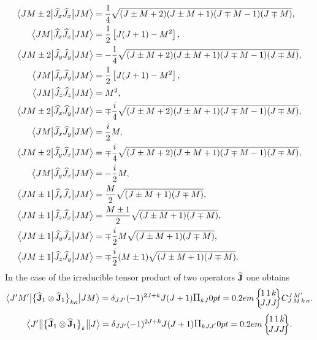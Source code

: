 \begin{align}
\bigl\langle  J M \pm 2 \big|  \widehat{J}_{x} \widehat{J}_{x} \big| J M \bigr\rangle & =\frac{1}{4} \sqrt{(J \pm M+2)(J \pm M+1)(J \mp M-1)(J \mp M)}, \notag\\
\bigl\langle  J M \big|  \widehat{J}_{x} \widehat{J}_{x} \big| J M \bigr\rangle & =\frac{1}{2}\left[J(J+1)-M^{2}\right], \notag\\
\bigl\langle  J M \pm 2 \big|  \widehat{J}_{y} \widehat{J}_{y} \big| J M \bigr\rangle & =-\frac{1}{4} \sqrt{(J \pm M+2)(J \pm M+1)(J \mp M-1)(J \mp M)}, \notag\\
\bigl\langle  J M \big|  \widehat{J}_{y} \widehat{J}_{y} \big| J M \bigr\rangle & =\frac{1}{2}\left[J(J+1)-M^{2}\right], \notag\\
\bigl\langle  J M \big|  \widehat{J}_{z} \widehat{J}_{z} \big| J M \bigr\rangle & =M^{2}, \notag\\
\bigl\langle  J M \pm 2 \big|  \widehat{J}_{x} \widehat{J}_{y} \big| J M \bigr\rangle & =\mp \frac{i}{4} \sqrt{(J \pm M+2)(J \pm M+1)(J \mp M-1)(J \mp M)}, \notag\\
\bigl\langle  J M \big|  \widehat{J}_{x} \widehat{J}_{y} \big| J M \bigr\rangle & =\frac{i}{2} M  \label{eq:13:2:46},\\
\bigl\langle  J M \pm 2 \big|  \widehat{J}_{y} \widehat{J}_{x} \big| J M \bigr\rangle & =\mp \frac{i}{4} \sqrt{(J \pm M+2)(J \pm M+1)(J \mp M-1)(J \mp M)}, \notag\\
\bigl\langle  J M \big|  \widehat{J}_{y} \widehat{J}_{x} \big| J M \bigr\rangle & =-\frac{i}{2} M, \notag\\
\bigl\langle  J M \pm 1 \big|  \widehat{J}_{x} \widehat{J}_{z} \big| J M \bigr\rangle & =\frac{M}{2} \sqrt{(J \pm M+1)(J \mp M)}, \notag\\
\bigl\langle  J M \pm 1 \big|  \widehat{J}_{z} \widehat{J}_{x} \big| J M \bigr\rangle & =\frac{M \pm 1}{2} \sqrt{(J \pm M+1)(J \mp M)}, \notag\\
\bigl\langle  J M \pm 1 \big|  \widehat{J}_{y} \widehat{J}_{z} \big| J M \bigr\rangle & =\mp \frac{i}{2} M \sqrt{(J \pm M+1)(J \mp M)}, \notag\\
\bigl\langle  J M \pm 1 \big|  \widehat{J}_{z} \widehat{J}_{y} \big| J M \bigr\rangle & =\mp \frac{i}{2}(M \pm 1) \sqrt{(J \pm M+1)(J \mp M)}. \notag
\end{align}
In the case of the irreducible tensor product of two operators \(\widehat{\mathbf{J}}\) one obtains
\begin{equation}
\braOket{ J^{\prime} M^{\prime}}{\bigl\{\widehat{\vect{J}}_{1} \otimes \widehat{\vect{J}}_{1}\bigr\}_{k \kappa}}{J M}=\delta_{J J^{\prime}}(-1)^{2 J+k} J(J+1) \Fact{k J}
\sixj{1}{1}{k}{J}{J}{J}
\clebsch{J}{M}{k}{\kappa}{J}{M^{\prime}}. \label{eq:13:2:47}
\end{equation}
\begin{equation*}
\braOketred{ J^{\prime}}{\bigl\{\widehat{\vect{J}}_{1} \otimes \widehat{\vect{J}}_{1}\bigr\}_{k}}{ J}=\delta_{J J^{\prime}}(-1)^{2 J+k} J(J+1) \Fact{k J J^{\prime}}
\sixj{1}{1}{k}{J}{J}{J}.
\end{equation*}
